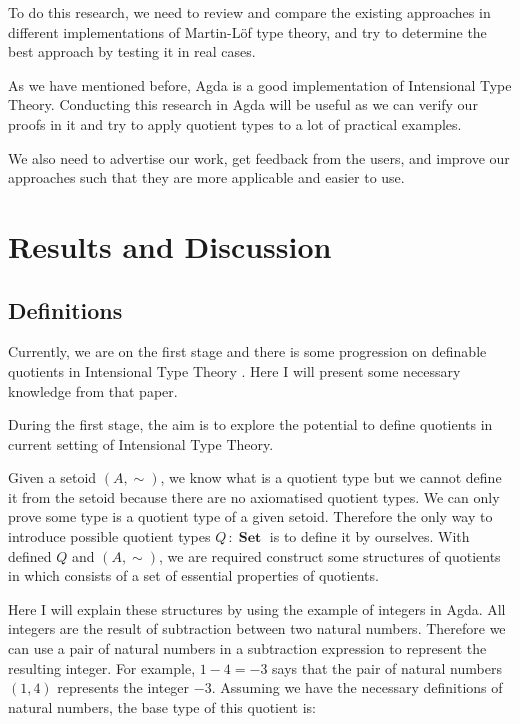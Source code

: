 \documentclass{article}
\theoremstyle{definition}
\DeclareMathOperator{\Set}{\mathbf{Set}}
\newcommand{\itt}{Intensional Type Theory}
\newcommand{\mltt}{Martin-L\"{o}f type theory}
\begin{document}
To do this research, we need to review and compare
the existing approaches in different implementations of \mltt{},
and try to determine the best approach by testing it in real cases.

As we have mentioned before, Agda is a good implementation of
\itt{}. Conducting this research in Agda will be useful as we can verify our proofs in it and try to apply quotient types
to a lot of practical examples.

We also need to advertise our work, get feedback from the users, and
improve our approaches such that they are more applicable and easier
to use.


\section{Results and Discussion}
\label{sec:rd}

\subsection{Definitions}
\label{sec:definitions}

Currently, we are on the first stage and there is some progression on
definable quotients in \itt{} \cite{aan}. Here I will present some necessary knowledge from that paper.


During the first stage, the aim is to explore the potential to define quotients
in current setting of \itt{}. 


Given a setoid $(A,\sim)$, we know what is a quotient type but we cannot define it from the setoid because there are no axiomatised quotient
types. We can only prove some type is a quotient type of a given
setoid. Therefore the only way to introduce possible quotient types $Q
\,\colon \Set$ is to define it by ourselves. With defined $Q$ and
$(A,\sim)$, we are required construct some structures of quotients in
\cite{aan} which consists of a set of essential properties of quotients.

Here I will explain these structures by using the example of integers
in Agda. All integers are the result of subtraction between two
natural numbers. Therefore we can use a pair of natural numbers in a subtraction
expression to represent the resulting integer.
For example, $1 - 4 = - 3$ says that the pair of natural numbers $(1,4)$
represents the integer $- 3$. Assuming we have the necessary definitions
of natural numbers, the base type of this quotient is:
\end{document}
